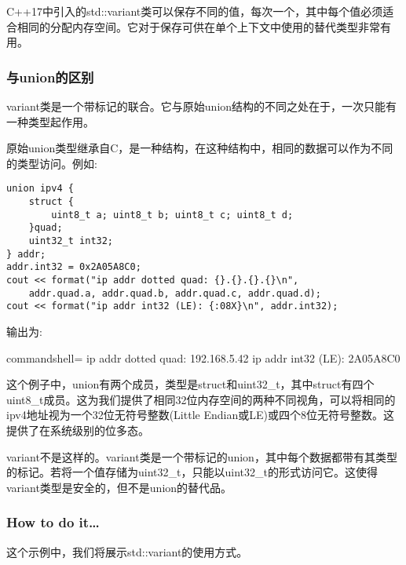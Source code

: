 
C++17中引入的std::variant类可以保存不同的值，每次一个，其中每个值必须适合相同的分配内存空间。它对于保存可供在单个上下文中使用的替代类型非常有用。

\subsubsection{与union的区别}

variant类是一个带标记的联合。它与原始union结构的不同之处在于，一次只能有一种类型起作用。

原始union类型继承自C，是一种结构，在这种结构中，相同的数据可以作为不同的类型访问。例如:

\begin{lstlisting}[style=styleCXX]
union ipv4 {
	struct {
		uint8_t a; uint8_t b; uint8_t c; uint8_t d;
	}quad;
	uint32_t int32;
} addr;
addr.int32 = 0x2A05A8C0;
cout << format("ip addr dotted quad: {}.{}.{}.{}\n",
	addr.quad.a, addr.quad.b, addr.quad.c, addr.quad.d);
cout << format("ip addr int32 (LE): {:08X}\n", addr.int32);
\end{lstlisting}

输出为:

\begin{tcblisting}{commandshell={}}
ip addr dotted quad: 192.168.5.42
ip addr int32 (LE): 2A05A8C0
\end{tcblisting}

这个例子中，union有两个成员，类型是struct和uint32\_t，其中struct有四个uint8\_t成员。这为我们提供了相同32位内存空间的两种不同视角，可以将相同的ipv4地址视为一个32位无符号整数(Little Endian或LE)或四个8位无符号整数。这提供了在系统级别的位多态。

variant不是这样的。variant类是一个带标记的union，其中每个数据都带有其类型的标记。若将一个值存储为uint32\_t，只能以uint32\_t的形式访问它。这使得variant类型是安全的，但不是union的替代品。

\subsubsection{How to do it…}

这个示例中，我们将展示std::variant的使用方式。

